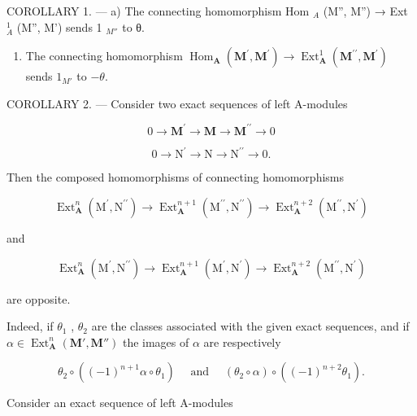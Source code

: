 COROLLARY 1. --- a) The connecting homomorphism Hom \(_{A}\) (M'', M'') → Ext \(_{A}^{1}\) (M'', M') sends 1 \(_{M''}\) to θ.

\begin{enumerate}
\def\labelenumi{\alph{enumi})}
\setcounter{enumi}{1}
\tightlist
\item
  The connecting homomorphism \(\operatorname{Hom}_{\mathbf{A}}(\mathbf{M}^{\prime},\mathbf{M}^{\prime})\to\operatorname{Ext}_{\mathbf{A}}^{1}(\mathbf{M}^{\prime\prime},\mathbf{M}^{\prime})\) sends \(1_{M'}\) to \(-\theta\).
\end{enumerate}

COROLLARY 2. --- Consider two exact sequences of left A-modules

\[
0 \rightarrow \mathbf {M} ^ {\prime} \rightarrow \mathbf {M} \rightarrow \mathbf {M} ^ {\prime \prime} \rightarrow 0
\]

\[
0 \rightarrow \mathrm{N} ^ {\prime} \rightarrow \mathrm{N} \rightarrow \mathrm{N} ^ {\prime \prime} \rightarrow 0.
\]

Then the composed homomorphisms of connecting homomorphisms

\[
\operatorname{Ext} _ {\mathbf {A}} ^ {n} \left(\mathrm{M} ^ {\prime}, \mathrm{N} ^ {\prime \prime}\right)\rightarrow \operatorname{Ext} _ {\mathbf {A}} ^ {n + 1} \left(\mathrm{M} ^ {\prime \prime}, \mathrm{N} ^ {\prime \prime}\right)\rightarrow \operatorname{Ext} _ {\mathbf {A}} ^ {n + 2} \left(\mathrm{M} ^ {\prime \prime}, \mathrm{N} ^ {\prime}\right)
\]

and

\[
\operatorname{Ext} _ {\mathbf {A}} ^ {n} \left(\mathrm{M} ^ {\prime}, \mathrm{N} ^ {\prime \prime}\right)\rightarrow \operatorname{Ext} _ {\mathbf {A}} ^ {n + 1} \left(\mathrm{M} ^ {\prime}, \mathrm{N} ^ {\prime}\right)\rightarrow \operatorname{Ext} _ {\mathbf {A}} ^ {n + 2} \left(\mathrm{M} ^ {\prime \prime}, \mathrm{N} ^ {\prime}\right)
\]

are opposite.

Indeed, if \(\theta_{1}\) , \(\theta_{2}\) are the classes associated with the given exact sequences, and if \(\alpha \in \operatorname{Ext}_{\mathbf{A}}^{n}(\mathbf{M}', \mathbf{M}'')\) the images of \(\alpha\) are respectively

\[
\theta_ {2} \circ ((- 1) ^ {n + 1} \alpha \circ \theta_ {1}) \quad \text { and } \quad (\theta_ {2} \circ \alpha) \circ ((- 1) ^ {n + 2} \theta_ {1}).
\]

Consider an exact sequence of left A-modules

